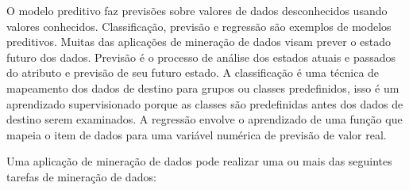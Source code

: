 O modelo preditivo faz previsões sobre valores de dados desconhecidos usando valores conhecidos. Classificação, previsão e regressão são exemplos de modelos preditivos. Muitas das aplicações de mineração de dados visam prever o estado futuro dos dados. Previsão é o processo de análise dos estados atuais e passados do atributo e previsão de seu futuro estado. A classificação é uma técnica de mapeamento dos dados de destino para grupos ou classes predefinidos, isso é um aprendizado supervisionado porque as classes são predefinidas antes dos dados de destino serem examinados. A regressão envolve o aprendizado de uma função que mapeia o item de dados para uma variável numérica de previsão de valor real.

Uma aplicação de mineração de dados pode realizar uma ou mais das seguintes tarefas de mineração de dados:

